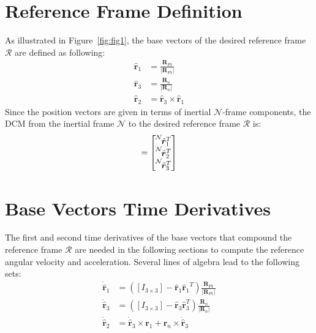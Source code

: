 \documentclass[]{AVSSimReportMemo}
\begin{document}
\section{Reference Frame Definition}
As illustrated in Figure~\ref{fig:fig1}, the base vectors of the desired reference frame $\mathcal{R}$  are defined as following:
\begin{subequations}
	\begin{align}
		\hat{\bm r}_{1} &= \frac{{\bm R}_{P1}} {|{\bm R}_{P1}|} \\
		\hat{\bm r}_{3} &= \frac{{\bm R}_{n}}{|{\bm R}_{n}|} \\
		\hat{\bm r}_{2} &=  \hat{\bm r}_{3} \times \hat{\bm r}_{1} 
	\end{align}
\end{subequations}
Since the position vectors are given in terms of inertial $\mathcal{N}$-frame components, the DCM from the inertial frame $\mathcal{N}$ to the desired reference frame $\mathcal{R}$ is:
\begin{equation}
	[RN] = \begin{bmatrix}
		\leftexp{N}{ \hat{\bm r}_{1}^{T} } \\
		\leftexp{N}{ \hat{\bm r}_{2}^{T} }  \\
		\leftexp{N}{ \hat{\bm r}_{3}^{T} }  
	\end{bmatrix}
\end{equation}
\section{Base Vectors Time Derivatives}
The first and second time derivatives of the base vectors that compound the reference frame $\mathcal{R}$ are needed in the following sections to compute the reference angular velocity and acceleration. Several lines of algebra lead to the following sets:
\begin{subequations}
	\begin{align}
		\dot{\hat{\bm{r}}}_1 &= ([I_{3\times3}] - {\hat{\bm{r}}_1}{\hat{\bm{r}}_1}^T)  \frac{{\bm R}_{P1}} {|{\bm R}_{P1}|} \\
		\dot{\hat{\bm{r}}}_3 &= ([I_{3\times3}] - \hat{\bm{r}}_3 \hat{\bm{r}}_3^T)  \frac{{\bm R}_{n}} {|{\bm R}_{n}|} \\
		\dot{\hat{\bm{r}}}_2 &= \dot{\hat{\bm{r}}}_3 \times \bm{r}_1 +  \bm{r}_n  \times \dot{\hat{\bm{r}}}_3 
	\end{align}
\end{subequations}
\end{document}
